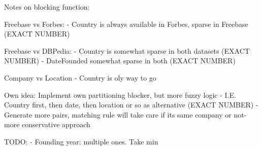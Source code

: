 Notes on blocking function:

Freebase vs Forbes: 
- Country is always available in Forbes, sparse in Freebase (EXACT NUMBER)

Freebase vs DBPedia:
- Country is somewhat sparse in both datasets (EXACT NUMBER)
- DateFounded somewhat sparse in both (EXACT NUMBER)

Company vs Location
- Country is oly way to go

Own idea: Implement own partitioning blocker, but more fuzzy logic
- I.E. Country first, then date, then location or so as alternative (EXACT NUMBER)
- Generate more pairs, matching rule will take care if its same company or not- more conservative approach


TODO: 
- Founding year: multiple ones. Take min